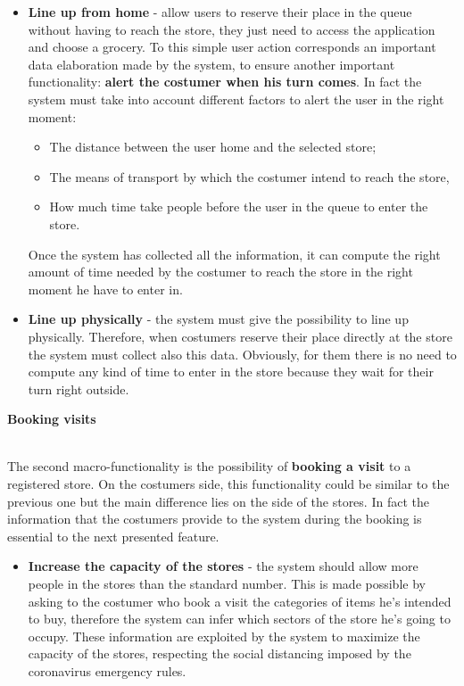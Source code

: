 \documentclass[]{article}
\begin{document}
\begin{itemize}
	\renewcommand{\labelitemi}{$-$}
	\item \textbf{Line up from home} - allow users to reserve their place in the queue without having to reach the store, they just need to access the application and choose a grocery. To this simple user action corresponds an important data elaboration made by the system, to ensure another important functionality: \textbf{alert the costumer when his turn comes}. In fact the system must take into account different factors to alert the user in the right moment:
	\begin{itemize}
		\renewcommand{\labelitemi}{$-$}
		\item The distance between the user home and the selected store;
		\item The means of transport by which the costumer intend to reach the store,
		\item How much time take people before the user in the queue to enter the store.
	\end{itemize} 
	Once the system has collected all the information, it can compute the right amount of time needed by the costumer to reach the store in the right moment he have to enter in.
	\item \textbf{Line up physically} - the system must give the possibility to line up physically. Therefore, when costumers reserve their place directly at the store the system must collect also this data. Obviously, for them there is no need to compute any kind of time to enter in the store because they wait for their turn right outside.
\end{itemize}	
\begin{large}
	\textbf{Booking visits}
\end{large}
\smallskip
\\
The second macro-functionality is the possibility of \textbf{booking a visit} to a registered store. On the costumers side, this functionality could be similar to the previous one but the main difference lies on the side of the stores. In fact the information that the costumers provide to the system during the booking is essential to the next presented feature.
\begin{itemize}
	\renewcommand{\labelitemi}{$-$}
	\item \textbf{Increase the capacity of the stores} - the system should allow more people in the stores than the standard number. This is made possible by asking to the costumer who book a visit the categories of items he's intended to buy, therefore the system can infer which sectors of the store he's going to occupy. These information are exploited by the system to maximize the capacity of the stores, respecting the social distancing imposed by the coronavirus emergency rules.
\end{itemize}
\end{document}
